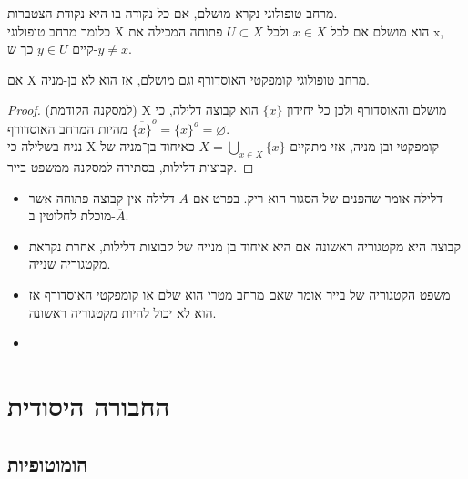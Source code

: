 \documentclass{tstextbook}
\begin{document}
\begin{definition}
מרחב טופולוגי נקרא מושלם, אם כל נקודה בו היא נקודת הצטברות.\\

כלומר מרחב טופולוגי X הוא מושלם אם לכל \(x\in X\) ולכל \(U\subset X\) פתוחה המכילה את x, קיים \(y\in U\) כך ש-\(y\ne x\).  

\end{definition}
\begin{corollary}
אם X מרחב טופולוגי קומפקטי האוסדורף וגם מושלם, אז הוא לא בן-מניה.

\end{corollary}
\begin{proof}
(למסקנה הקודמת)
X מושלם והאוסדורף ולכן כל יחידון \(\{x\}\) הוא קבוצה דלילה, כי מהיות המרחב האוסדורף \(\overline{\{x\}}^{o}=\{x\}^{o}=\varnothing\).\\

נניח בשלילה כי X קומפקטי ובן מניה, אזי מתקיים \(X=\bigcup_{x\in X}\{x\}\) כאיחוד בן־מניה של קבוצות דלילות, בסתירה למסקנה ממשפט בייר.  

\end{proof}
\begin{summary}
  \begin{itemize}
    \item דלילה אומר שהפנים של הסגור הוא ריק. בפרט אם \(A\) דלילה אין קבוצה פתוחה אשר מוכלת לחלוטין ב-\(\overline{A}\).
    \item קבוצה היא מקטגוריה ראשונה אם היא איחוד בן מנייה של קבוצות דלילות, אחרת נקראת מקטגוריה שנייה.
    \item משפט הקטגוריה של בייר אומר שאם מרחב מטרי הוא שלם או קומפקטי האוסדורף אז הוא לא יכול להיות מקטגוריה ראשונה.
    \item 
  \end{itemize}
\end{summary}
\chapter{החבורה היסודית}

\section{הומוטופיות}
\end{document}
